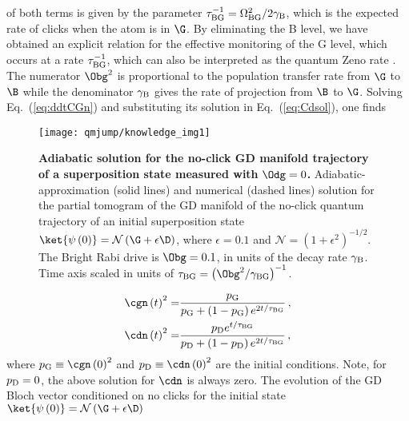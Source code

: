 of both terms is given by the parameter $\tau_{\mathrm{BG}}^{-1}=\Omega_{{\rm BG}}^{2}/2\gamma_{\mathrm{B}}$,
which is the expected rate of clicks when the atom is in $\G$. By
eliminating the B level, we have obtained an explicit relation for
the effective monitoring of the G level, which occurs at a rate $\tau_{{\rm BG}}^{-1}$,
which can also be interpreted as the quantum Zeno rate \citep{Misra1977,Gambetta2008-qm-traj,Matsuzaki2010,Vijay2011,Slichter2016-T1vsNbar,Harrington2017,Hacohen-Gourgy2018}.
The numerator $\Obg^{2}$ is proportional to the population transfer
rate from $\G$ to $\B$ while the denominator $\gamma_{{\rm B}}$
gives the rate of projection from $\B$ to $\G$. Solving Eq.~(\ref{eq:ddtCGn})
and substituting its solution in Eq.~(\ref{eq:Cdsol}), one finds
\begin{figure}
\begin{centering}
\texttt{[image: qmjump/knowledge\_img1]}
\par\end{centering}
\caption[Adiabatic solution for the no-click GD manifold trajectory of a superposition
state measured with $\Odg=0$]{\textbf{\label{fig:3:adiabatic-sol}Adiabatic solution for the no-click
GD manifold trajectory of a superposition state measured with }$\Odg=0$\textbf{.
}Adiabatic-approximation (solid lines) and numerical (dashed lines)
solution for the partial tomogram of the GD manifold of the no-click
quantum trajectory of an initial superposition state $\ket{\psi\left(0\right)}=\mathcal{N}\left(\G+\epsilon\D\right)$,
where $\epsilon=0.1$ and $\mathcal{N}=\left(1+\epsilon^{2}\right)^{-1/2}$.
The Bright Rabi drive is $\Obg=0.1$, in units of the decay rate $\gamma_{{\rm B}}$.
Time axis scaled in units of $\tau_{\mathrm{BG}}=\left(\Obg^{2}/\gamma_{{\rm BG}}\right)^{-1}.$}
\end{figure}
\begin{align}
\cgn\left(t\right)^{2}= & \frac{p_{{\rm G}}}{p_{{\rm G}}+\left(1-p_{{\rm G}}\right)e^{2t/\tau_{{\rm BG}}}}\,,\label{eq:Cgnoclicksol}\\
\cdn\left(t\right)^{2}= & \frac{p_{{\rm D}}e^{t/\tau_{{\rm BG}}}}{p_{{\rm D}}+\left(1-p_{{\rm D}}\right)e^{2t/\tau_{{\rm BG}}}}\,,\label{eq:CdNoClickSol}
\end{align}
where $p_{{\rm G}}\equiv\cgn\left(0\right)^{2}$ and $p_{{\rm D}}\equiv\cdn\left(0\right)^{2}$
are the initial conditions. Note, for $p_{{\rm D}}=0$, the above
solution for $\cdn$ is always zero. The evolution of the GD Bloch
vector conditioned on no clicks for the initial state $\ket{\psi\left(0\right)}=\mathcal{N}\left(\G+\epsilon\D\right)$
